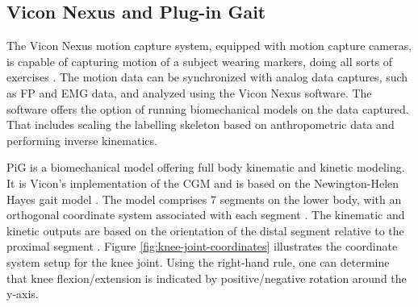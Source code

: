 \documentclass[../main.tex]{subfiles}
\begin{document}
\subsection{Vicon Nexus and Plug-in Gait}
\label{sec:A-Vicon-and-PiG}
The Vicon Nexus motion capture system, equipped with motion capture cameras, is capable of capturing motion of a subject wearing markers, doing all sorts of exercises \cite{vicon-user-guide}.
The motion data can be synchronized with analog data captures, such as \ac{FP} and \ac{EMG} data, and analyzed using the Vicon Nexus software.
The software offers the option of running biomechanical models on the data captured. 
That includes scaling the labelling skeleton based on anthropometric data and performing inverse kinematics.

\Ac{PiG} is a biomechanical model offering full body kinematic and kinetic modeling. 
It is Vicon's implementation of the \ac{CGM} and is based on the Newington-Helen Hayes gait model \cite{vicon-user-guide, viconpig}. 
The model  comprises 7 segments on the lower body, with an orthogonal coordinate system associated with each segment \cite{Baker2017}.
The kinematic and kinetic outputs are based on the orientation of the distal segment relative to the proximal segment \cite{Leboeuf2019, Baker2017, cgm-outputs}. 
Figure \ref{fig:knee-joint-coordinates} illustrates the coordinate system setup for the knee joint.
Using the right-hand rule, one can determine that knee flexion/extension is indicated by positive/negative rotation around the y-axis.
\end{document}

